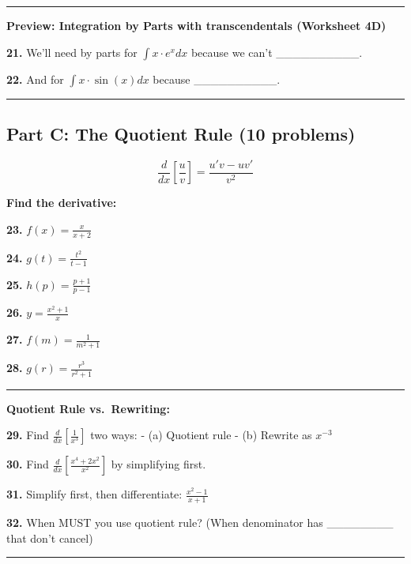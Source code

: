 \documentclass[
  11pt,
]{article}
\begin{document}
\begin{center}\rule{0.5\linewidth}{0.5pt}\end{center}

\textbf{Preview: Integration by Parts with transcendentals (Worksheet
4D)}

\textbf{21.} We'll need by parts for \(\int x \cdot e^x dx\) because we
can't \_\_\_\_\_\_\_\_\_\_.

\textbf{22.} And for \(\int x \cdot \sin(x) dx\) because
\_\_\_\_\_\_\_\_\_\_.

\begin{center}\rule{0.5\linewidth}{0.5pt}\end{center}

\hypertarget{part-c-the-quotient-rule-10-problems}{%
\subsection{Part C: The Quotient Rule (10
problems)}\label{part-c-the-quotient-rule-10-problems}}

\[\frac{d}{dx}\left[\frac{u}{v}\right] = \frac{u'v - uv'}{v^2}\]

\textbf{Find the derivative:}

\textbf{23.} \(f(x) = \frac{x}{x + 2}\)

\textbf{24.} \(g(t) = \frac{t^2}{t - 1}\)

\textbf{25.} \(h(p) = \frac{p + 1}{p - 1}\)

\textbf{26.} \(y = \frac{x^2 + 1}{x}\)

\textbf{27.} \(f(m) = \frac{1}{m^2 + 1}\)

\textbf{28.} \(g(r) = \frac{r^3}{r^2 + 1}\)

\begin{center}\rule{0.5\linewidth}{0.5pt}\end{center}

\textbf{Quotient Rule vs.~Rewriting:}

\textbf{29.} Find \(\frac{d}{dx}\left[\frac{1}{x^3}\right]\) two ways: -
(a) Quotient rule - (b) Rewrite as \(x^{-3}\)

\textbf{30.} Find \(\frac{d}{dx}\left[\frac{x^4 + 2x^2}{x^2}\right]\) by
simplifying first.

\textbf{31.} Simplify first, then differentiate:
\(\frac{x^2 - 1}{x + 1}\)

\textbf{32.} When MUST you use quotient rule? (When denominator has
\_\_\_\_\_\_\_\_ that don't cancel)

\begin{center}\rule{0.5\linewidth}{0.5pt}\end{center}
\end{document}

